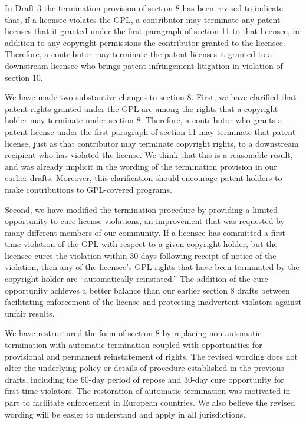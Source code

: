 In Draft 3 the termination provision of section 8 has been revised to
indicate that, if a licensee violates the GPL, a contributor may terminate
any patent licenses that it granted under the first paragraph of section 11
to that licensee, in addition to any copyright permissions the contributor
granted to the licensee.  Therefore, a contributor may terminate the patent
licenses it granted to a downstream licensee who brings patent infringement
litigation in violation of section 10.

We have made two substantive changes to section 8.  First, we have clarified
that patent rights granted under the GPL are among the rights that a
copyright holder may terminate under section 8.  Therefore, a contributor who
grants a patent license under the first paragraph of section 11 may terminate
that patent license, just as that contributor may terminate copyright rights,
to a downstream recipient who has violated the license.  We think that this
is a reasonable result, and was already implicit in the wording of the
termination provision in our earlier drafts.  Moreover, this clarification
should encourage patent holders to make contributions to GPL-covered
programs.

Second, we have modified the termination procedure by providing a limited
opportunity to cure license violations, an improvement that was requested by
many different members of our community.  If a licensee has committed a
first-time violation of the GPL with respect to a given copyright holder, but
the licensee cures the violation within 30 days following receipt of notice
of the violation, then any of the licensee's GPL rights that have been
terminated by the copyright holder are ``automatically reinstated.''  The
addition of the cure opportunity achieves a better balance than our earlier
section 8 drafts between facilitating enforcement of the license and
protecting inadvertent violators against unfair results.

We have restructured the form of section 8 by replacing non-automatic
termination with automatic termination coupled with opportunities for
provisional and permanent reinstatement of rights.  The revised wording does
not alter the underlying policy or details of procedure established in the
previous drafts, including the 60-day period of repose and 30-day cure
opportunity for first-time violators.  The restoration of automatic
termination was motivated in part to facilitate enforcement in European
countries.  We also believe the revised wording will be easier to understand
and apply in all jurisdictions.

